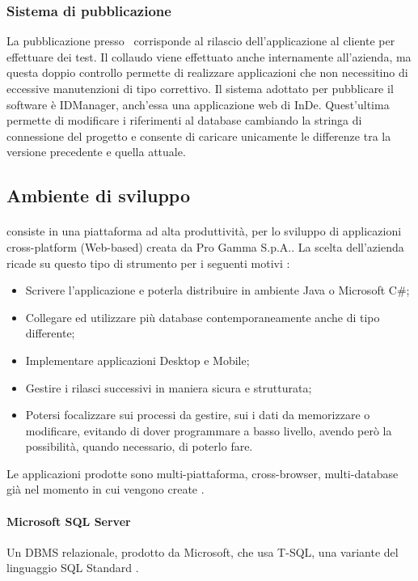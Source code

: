 \subsubsection{Sistema di pubblicazione}
La pubblicazione presso \azienda\ corrisponde al rilascio dell'applicazione al cliente per effettuare dei test. Il collaudo viene effettuato anche internamente all'azienda, ma questa doppio controllo permette di realizzare applicazioni che non necessitino di eccessive manutenzioni di tipo correttivo. 
Il sistema adottato per pubblicare il software è IDManager, anch'essa una applicazione web di InDe. Quest'ultima permette di modificare i riferimenti al database cambiando la stringa di connessione del progetto e consente di caricare unicamente le differenze tra la versione precedente e quella attuale.


\subsection{Ambiente di sviluppo}
\label{cap1:Ambiente di sviluppo}

\paragraph{\inde} consiste in una piattaforma ad alta produttività, per lo sviluppo di applicazioni cross-platform (Web-based) creata da Pro Gamma S.p.A.. La scelta dell'azienda ricade su questo tipo di strumento per i seguenti motivi \hyperref[bib1]{\cite{[1]}}:
\begin{itemize}
	\item Scrivere l'applicazione e poterla distribuire in ambiente Java o Microsoft C\#;
	\item Collegare ed utilizzare più database contemporaneamente anche di tipo differente;
	\item Implementare applicazioni Desktop e Mobile;
	\item Gestire i rilasci successivi in maniera sicura e strutturata;
	\item Potersi focalizzare sui processi da gestire, sui i dati da memorizzare o modificare, evitando di dover programmare a basso livello, avendo però la possibilità, quando necessario, di poterlo fare.
\end{itemize}
Le applicazioni prodotte sono multi-piattaforma, cross-browser, multi-database già nel momento in cui vengono create \hyperref[bib1]{\cite{[1]}}.

\paragraph{Microsoft SQL Server} Un DBMS relazionale, prodotto da Microsoft, che usa T-SQL, una variante del linguaggio SQL Standard \hyperref[bib7]{\cite{[7]}}. 

